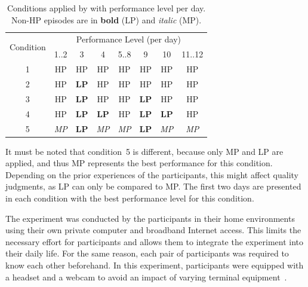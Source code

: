\begin{table}[b]
	\centering
	\caption[\citet{moller_single-call_2011}: overview on conditions]{Conditions applied by \citet{moller_single-call_2011} with performance level per day.
	Non-\acs{HP} episodes are in \textbf{bold} (\acs{LP}) and \textit{italic} (\acs{MP}).}
	\label{tab:chap05:conditions}
	\begin{tabular}{c|c|c|c|c|c|c|c}
	\multirow{2}{*}{Condition} & \multicolumn{7}{c}{Performance Level (per day)} \\
		& 1..2 		& 3 & 4 & 5..8 & 9 & 10 & 11..12  \\
	\midrule
	1 & \ac{HP} & \acs{HP} & \acs{HP} & \acs{HP} & \acs{HP} & \acs{HP} & \acs{HP} \\
	\hline
	2 & \ac{HP} & \textbf{\acs{LP}} & \acs{HP} & \acs{HP} & \acs{HP} & \acs{HP} & \acs{HP} \\
	\hline
	3 & \ac{HP} & \textbf{\acs{LP}} & \acs{HP} & \acs{HP} & \textbf{\acs{LP}} & \acs{HP} & \acs{HP} \\
	\hline
	4 & \ac{HP} & \textbf{\acs{LP}} & \textbf{\acs{LP}} & \acs{HP} & \textbf{\acs{LP}} & \textbf{\acs{LP}} & \acs{HP} \\
	\hline
	5 & \textit{\ac{MP}} & \textbf{\acs{LP}} & \textit{\acs{MP}} & \textit{\acs{MP}} & \textbf{\acs{LP}} & \textit{\acs{MP}} & \textit{\acs{MP}} \\
	\end{tabular}
\end{table}

It must be noted that condition~5 is different, because only \ac{MP} and \ac{LP} are applied, and thus \ac{MP} represents the best performance for this condition.
Depending on the prior experiences of the participants, this might affect quality judgments, as \ac{LP} can only be compared to \ac{MP}.
The first two days are presented in each condition with the best performance level for this condition.

The experiment was conducted by the participants in their home environments using their own private computer and broadband Internet access.
This limits the necessary effort for participants and allows them to integrate the experiment into their daily life.
For the same reason, each pair of participants was required to know each other beforehand.
In this experiment, participants were equipped with a headset and a webcam to avoid an impact of varying terminal equipment~\citep[][]{moller_single-call_2011}.

